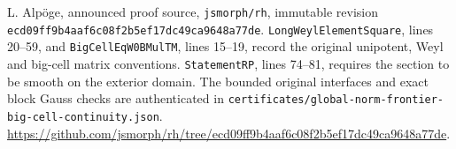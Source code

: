 L. Alp\"oge, announced proof source, \texttt{jsmorph/rh},
immutable revision
\texttt{ecd09ff9b4aaf6c08f2b5ef17dc49ca9648a77de}.
\texttt{LongWeylElementSquare}, lines 20--59, and
\texttt{BigCellEqW0BMulTM}, lines 15--19, record the original
unipotent, Weyl and big-cell matrix conventions.
\texttt{StatementRP}, lines 74--81, requires the section to be
smooth on the exterior domain.
The bounded original interfaces and exact block Gauss checks
are authenticated in
\texttt{certificates/global-norm-frontier-big-cell-continuity.json}.
\url{https://github.com/jsmorph/rh/tree/ecd09ff9b4aaf6c08f2b5ef17dc49ca9648a77de}.
